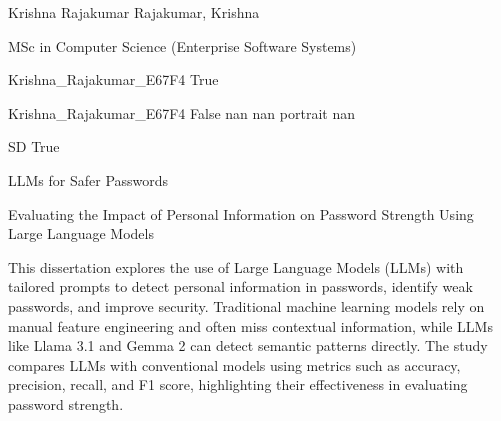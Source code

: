 \documentclass[twoside]{report}
\begin{document}
\begingroup{}\relax



\def\Key{Krishna_Rajakumar_E67F4}

{Krishna Rajakumar}
{Rajakumar, Krishna}

{MSc in Computer Science (Enterprise Software Systems)}

{Krishna_Rajakumar_E67F4}
{True}

{Krishna_Rajakumar_E67F4}
{False}
{nan}
{nan}
{portrait}
{nan}

{SD}
{True}

{LLMs for Safer Passwords}

{Evaluating the Impact of Personal Information on Password Strength Using Large Language Models}

{This dissertation explores the use of Large Language Models (LLMs) with tailored prompts to detect personal information in passwords, identify weak passwords, and improve security. Traditional machine learning models rely on manual feature engineering and often miss contextual information, while LLMs like Llama 3.1 and Gemma 2 can detect semantic patterns directly. The study compares LLMs with conventional models using metrics such as accuracy, precision, recall, and F1 score, highlighting their effectiveness in evaluating password strength.}
\end{document}
